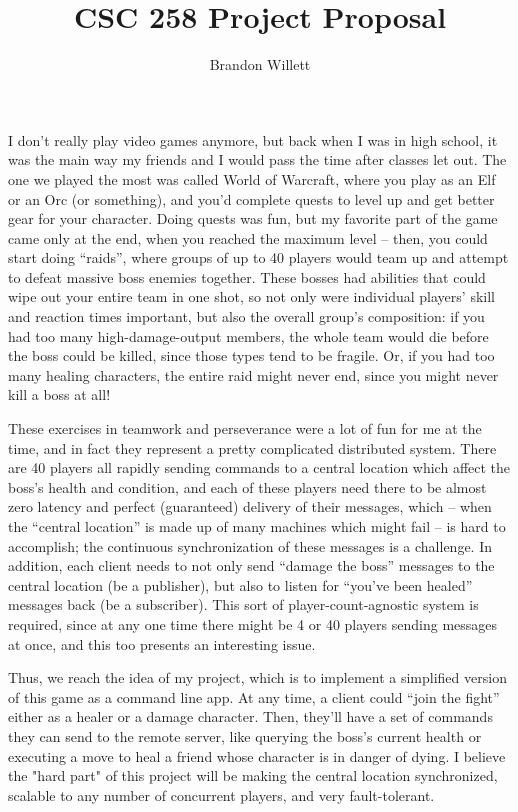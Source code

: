 \documentclass[letterpaper]{article}
\title{CSC 258 Project Proposal}
\author{Brandon Willett}
\begin{document}
	\maketitle

	I don't really play video games anymore, but back when I was in high school, it was the main way my friends and I would pass the time after classes let out. The one we played the most was called World of Warcraft, where you play as an Elf or an Orc (or something), and you'd complete quests to level up and get better gear for your character. Doing quests was fun, but my favorite part of the game came only at the end, when you reached the maximum level -- then, you could start doing ``raids'', where groups of up to 40 players would team up and attempt to defeat massive boss enemies together. These bosses had abilities that could wipe out your entire team in one shot, so not only were individual players' skill and reaction times important, but also the overall group's composition: if you had too many high-damage-output members, the whole team would die before the boss could be killed, since those types tend to be fragile. Or, if you had too many healing characters, the entire raid might never end, since you might never kill a boss at all!

	These exercises in teamwork and perseverance were a lot of fun for me at the time, and in fact they represent a pretty complicated distributed system. There are 40 players all rapidly sending commands to a central location which affect the boss's health and condition, and each of these players need there to be almost zero latency and perfect (guaranteed) delivery of their messages, which -- when the ``central location'' is made up of many machines which might fail -- is hard to accomplish; the continuous synchronization of these messages is a challenge. In addition, each client needs to not only send ``damage the boss'' messages to the central location (be a publisher), but also to listen for ``you've been healed'' messages back (be a subscriber). This sort of player-count-agnostic system is required, since at any one time there might be 4 or 40 players sending messages at once, and this too presents an interesting issue.

	Thus, we reach the idea of my project, which is to implement a simplified version of this game as a command line app. At any time, a client could ``join the fight'' either as a healer or a damage character. Then, they'll have a set of commands they can send to the remote server, like querying the boss's current health or executing a move to heal a friend whose character is in danger of dying. I believe the "hard part" of this project will be making the central location synchronized, scalable to any number of concurrent players, and very fault-tolerant. \clearpage
\end{document}
